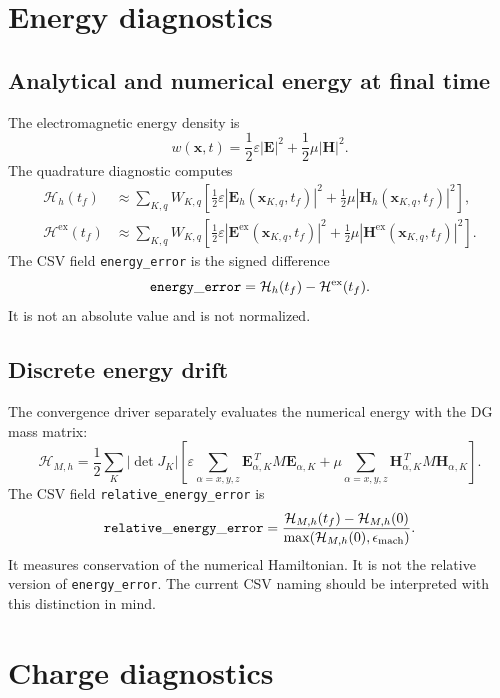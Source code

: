 \documentclass[11pt]{article}
\newcommand{\vect}[1]{\boldsymbol{#1}}
\newcommand{\abs}[1]{\left| #1 \right|}
\newcommand{\code}[1]{\nolinkurl{#1}}
\newcommand{\mcode}[1]{\mathtt{\detokenize{#1}}}
\newcommand{\Eex}{\vect E^{\mathrm{ex}}}
\newcommand{\Hex}{\vect H^{\mathrm{ex}}}
\newcommand{\Eh}{\vect E_h}
\newcommand{\Hh}{\vect H_h}
\begin{document}
\section{Energy diagnostics}

\subsection{Analytical and numerical energy at final time}

The electromagnetic energy density is
\[
  w(\vect x,t)
  =
  \frac{1}{2}\varepsilon\abs{\vect E}^2+
  \frac{1}{2}\mu\abs{\vect H}^2.
\]
The quadrature diagnostic computes
\begin{align}
  \mathcal{H}_h(t_f)
    &\approx
    \sum_{K,q}W_{K,q}
    \left[
      \frac{1}{2}\varepsilon\abs{\Eh(\vect x_{K,q},t_f)}^2+
      \frac{1}{2}\mu\abs{\Hh(\vect x_{K,q},t_f)}^2
    \right],\\
  \mathcal{H}^{\mathrm{ex}}(t_f)
    &\approx
    \sum_{K,q}W_{K,q}
    \left[
      \frac{1}{2}\varepsilon\abs{\Eex(\vect x_{K,q},t_f)}^2+
      \frac{1}{2}\mu\abs{\Hex(\vect x_{K,q},t_f)}^2
    \right].
\end{align}
The CSV field \code{energy_error} is the signed difference
\[
  \mcode{energy_error}
  =
  \mathcal{H}_h(t_f)-\mathcal{H}^{\mathrm{ex}}(t_f).
\]
It is not an absolute value and is not normalized.

\subsection{Discrete energy drift}

The convergence driver separately evaluates the numerical energy with the DG
mass matrix:
\[
  \mathcal{H}_{M,h}
  =
  \frac{1}{2}
  \sum_{K}
  \abs{\det J_K}
  \left[
    \varepsilon
    \sum_{\alpha=x,y,z}
      \vect E_{\alpha,K}^{\,T}M\vect E_{\alpha,K}
    +
    \mu
    \sum_{\alpha=x,y,z}
      \vect H_{\alpha,K}^{\,T}M\vect H_{\alpha,K}
  \right].
\]
The CSV field \code{relative_energy_error} is
\[
  \mcode{relative_energy_error}
  =
  \frac{
    \mathcal{H}_{M,h}(t_f)-\mathcal{H}_{M,h}(0)
  }{
    \max(\mathcal{H}_{M,h}(0),\epsilon_{\mathrm{mach}})
  }.
\]
It measures conservation of the numerical Hamiltonian. It is not the
relative version of \code{energy_error}. The current CSV naming should be
interpreted with this distinction in mind.

\section{Charge diagnostics}
\end{document}
